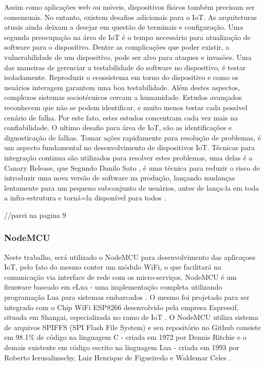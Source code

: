 \documentclass[journal]{IEEEtran}
\begin{document}
Assim como aplicações web ou móveis, dispositivos físicos também precisam ser consensuais. No entanto, existem desafios adicionais para o IoT. As arquiteturas atuais ainda deixam a desejar em questão de terminais e configuração. Uma segunda preocupação na área de IoT é o tempo necessário para atualização de software para o dispositivo. Dentre as  complicações que poder existir, a vulnerabilidade de um dispositivo, pode ser alvo para ataques e invasões. Uma das maneiras de gerenciar a testabilidade do software no dispositivo, é testar isoladamente. Reproduzir o ecossistema em torno do dispositivo e como os usuários interagem garantem uma boa testabilidade. Além destes aspectos, complexos sistemas sociotécnicos cercam a humanidade. Estudos avançados reconhecem que não se podem identificar, e muito menos testar cada possível cenário de falha. Por este fato, estes estudos concentram cada vez mais na confiabilidade. O ultimo desafio para área de IoT, são as identificações e dignosticação de falhas. Tomar ações rapidamente para resolução de problemas, é um aspecto fundamental no desenvolvimento de dispositivos IoT. Técnicas para integração continua são utilizados para resolver estes problemas, uma delas é a Canary Release, que Segundo Danilo Sato \cite{danilosato2017}, é uma técnica para reduzir o risco de introduzir uma nova versão de software na produção, lançando mudanças lentamente para um pequeno subconjunto de usuários, antes de lança-la em toda a infra-estrutura e torná=la disponível para todos \cite[p.~9]{dzoneiotvolume4}.



//parei na pagina 9







\subsubsection{NodeMCU}

Neste trabalho, será utilizado o NodeMCU para desenvolvimento das aplicaçoes IoT, pelo fato do mesmo conter um módulo WiFi, o que facilitará na comunicação via interface de rede com os micro-serviços. NodeMCU é um firmware baseado em eLua - uma implementação completa utilizando programação Lua para sistemas embarcados \cite{elua2017}. O mesmo foi projetado para ser integrado com o Chip WiFi ESP8266 desenvolvido pela empresa Espressif, situada em Shangai, especializada no ramo de IoT \cite{systems}. O NodeMCU utiliza sistema de arquivos SPIFFS (SPI Flash File System) e seu repositório no Github consiste
 em 98.1\% de código na linguagem C - criada em 1972 por Dennis Ritchie \cite{williamstewart2017} e o demais existente em código escrito na linguagem Lua  - criada em 1993 por Roberto Ierusalimschy, Luiz Henrique de Figueiredo e Waldemar Celes \cite{lua2017Authors}.
\end{document}
